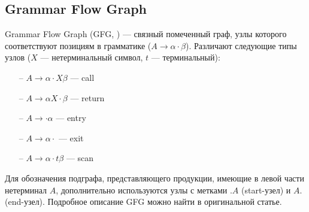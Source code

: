 


\subsection{Grammar Flow Graph}

Grammar Flow Graph (GFG, \cite{gfg}) --- связный помеченный граф, узлы которого соответствуют позициям в грамматике ($A \rightarrow \alpha \cdot \beta$). Различают следующие типы узлов ($X$ --- нетерминальный символ, $t$ --- терминальный):
\begin{itemize}
	\setlength\itemsep{-0.2em}
	\item[--] $A \rightarrow \alpha \cdot X \beta	$ --- call
	\item[--] $A \rightarrow \alpha X \cdot \beta$ --- return
	\item[--] $A \rightarrow \cdot \alpha$ --- entry
	\item[--] $A \rightarrow \alpha \cdot$ --- exit
	\item[--] $A \rightarrow \alpha \cdot t \beta$ --- scan
\end{itemize}
Для обозначения подграфа, представляющего продукции, имеющие в левой части нетерминал $A$, дополнительно используются узлы с метками $.A$ (start-узел) и $A.$ (end-узел). Подробное описание GFG можно найти в оригинальной статье.


